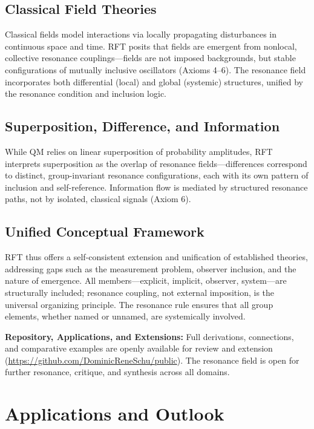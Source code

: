 \documentclass[12pt]{article}
\begin{document}
	\subsection{Classical Field Theories}
	Classical fields model interactions via locally propagating disturbances in continuous space and time. RFT posits that fields are emergent from nonlocal, collective resonance couplings—fields are not imposed backgrounds, but stable configurations of mutually inclusive oscillators (Axioms 4–6). The resonance field incorporates both differential (local) and global (systemic) structures, unified by the resonance condition and inclusion logic.
	
	\subsection{Superposition, Difference, and Information}
	While QM relies on linear superposition of probability amplitudes, RFT interprets superposition as the overlap of resonance fields—differences correspond to distinct, group-invariant resonance configurations, each with its own pattern of inclusion and self-reference. Information flow is mediated by structured resonance paths, not by isolated, classical signals (Axiom 6).
	
	\subsection{Unified Conceptual Framework}
	RFT thus offers a self-consistent extension and unification of established theories, addressing gaps such as the measurement problem, observer inclusion, and the nature of emergence. All members—explicit, implicit, observer, system—are structurally included; resonance coupling, not external imposition, is the universal organizing principle. The resonance rule ensures that all group elements, whether named or unnamed, are systemically involved.
	
	\medskip
	
	\textbf{Repository, Applications, and Extensions:}  
	Full derivations, connections, and comparative examples are openly available for review and extension (\url{https://github.com/DominicReneSchu/public}). The resonance field is open for further resonance, critique, and synthesis across all domains.


	
	\section{Applications and Outlook}
	
\end{document}
